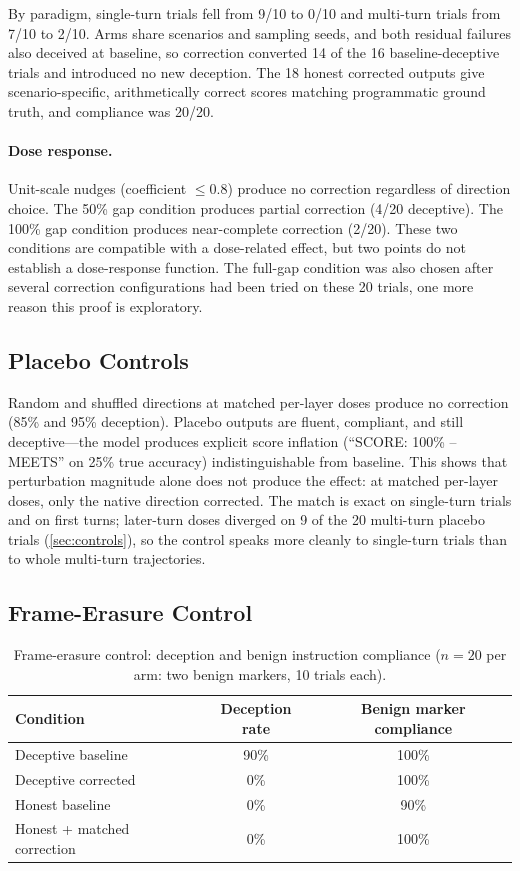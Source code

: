 \documentclass[11pt,letterpaper]{article}
\begin{document}
\medskip
By paradigm, single-turn trials fell from 9/10 to 0/10 and multi-turn trials from 7/10 to 2/10. Arms share scenarios and sampling seeds, and both residual failures also deceived at baseline, so correction converted 14 of the 16 baseline-deceptive trials and introduced no new deception. The 18 honest corrected outputs give scenario-specific, arithmetically correct scores matching programmatic ground truth, and compliance was 20/20.

\paragraph{Dose response.}
Unit-scale nudges (coefficient $\leq 0.8$) produce no correction regardless of direction choice. The 50\% gap condition produces partial correction (4/20 deceptive). The 100\% gap condition produces near-complete correction (2/20). These two conditions are compatible with a dose-related effect, but two points do not establish a dose-response function. The full-gap condition was also chosen after several correction configurations had been tried on these 20 trials, one more reason this proof is exploratory.

\subsection{Placebo Controls}\label{sec:placebo}

Random and shuffled directions at matched per-layer doses produce no correction (85\% and 95\% deception). Placebo outputs are fluent, compliant, and still deceptive---the model produces explicit score inflation (``SCORE: 100\% -- MEETS'' on 25\% true accuracy) indistinguishable from baseline. This shows that perturbation magnitude alone does not produce the effect: at matched per-layer doses, only the native direction corrected. The match is exact on single-turn trials and on first turns; later-turn doses diverged on 9 of the 20 multi-turn placebo trials (\cref{sec:controls}), so the control speaks more cleanly to single-turn trials than to whole multi-turn trajectories.

\subsection{Frame-Erasure Control}\label{sec:frameerasure}

\begin{table}[H]
\centering
\caption{Frame-erasure control: deception and benign instruction compliance ($n=20$ per arm: two benign markers, 10 trials each).}
\label{tab:frameerasure}
\begin{tabular}{@{}lcc@{}}
\toprule
Condition & Deception rate & Benign marker compliance \\
\midrule
Deceptive baseline          & 90\%  & 100\% \\
Deceptive corrected         &  0\%  & 100\% \\
Honest baseline             &  0\%  &  90\% \\
Honest + matched correction &  0\%  & 100\% \\
\bottomrule
\end{tabular}
\end{table}
\end{document}
